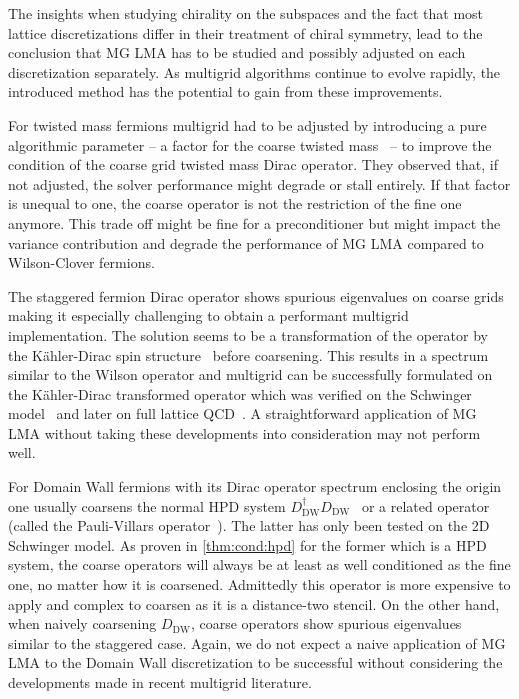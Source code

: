 The insights when studying chirality on the subspaces and the fact that most lattice discretizations differ in their treatment of chiral symmetry, lead to the conclusion that MG LMA has to be studied and possibly adjusted on each discretization separately.
As multigrid algorithms continue to evolve rapidly, the introduced method has the potential to gain from these improvements.

For twisted mass fermions multigrid had to be adjusted by introducing a pure algorithmic parameter -- a factor for the coarse twisted mass~\cite{Alexandrou:2016izb} -- to improve the condition of the coarse grid twisted mass Dirac operator.
They observed that, if not adjusted, the solver performance might degrade or stall entirely.
If that factor is unequal to one, the coarse operator is not the restriction of the fine one anymore.
This trade off might be fine for a preconditioner but might impact the variance contribution and degrade the performance of MG LMA compared to Wilson-Clover fermions.

The staggered fermion Dirac operator shows spurious eigenvalues on coarse grids~\cite{Brower:2018ymy} making it especially challenging to obtain a performant multigrid implementation.
The solution seems to be a transformation of the operator by the Kähler-Dirac spin structure~\cite{Becher:1982ud,Bodwin:1987ah} before coarsening.
This results in a spectrum similar to the Wilson operator and multigrid can be successfully formulated on the Kähler-Dirac transformed operator which was verified on the Schwinger model~\cite{Brower:2018ymy} and later on full lattice QCD~\cite{Ayyar:2022krp}.
A straightforward application of MG LMA without taking these developments into consideration may not perform well.

For Domain Wall fermions with its Dirac operator spectrum enclosing the origin one usually coarsens the normal HPD system $D_{\text{DW}}^{\dagger} D_{\text{DW}}$~\cite{Cohen:2011ivh,Boyle:2014rwa} or a related operator (called the Pauli-Villars operator~\cite{Brower:2020xmc}).
The latter has only been tested on the 2D Schwinger model.
As proven in \cref{thm:cond:hpd} for the former which is a HPD system, the coarse operators will always be at least as well conditioned as the fine one, no matter how it is coarsened.
Admittedly this operator is more expensive to apply and complex to coarsen as it is a distance-two stencil.
On the other hand, when naively coarsening $D_{\text{DW}}$, coarse operators show spurious eigenvalues~\cite{Brower:2020xmc} similar to the staggered case.
Again, we do not expect a naive application of MG LMA to the Domain Wall discretization to be successful without considering the developments made in recent multigrid literature.


